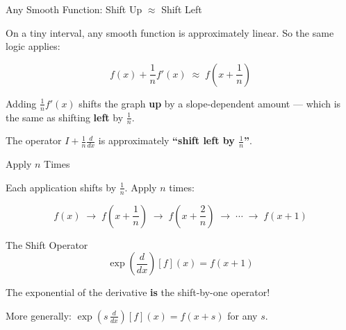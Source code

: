 \documentclass[10pt]{beamer}
\theoremstyle{definition}
\newcommand{\x}[1]{\alert{\textbf{#1}}}
\begin{document}
\begin{frame}[shrink=3]{Any Smooth Function: Shift Up $\approx$ Shift Left}

On a tiny interval, any smooth function is approximately linear. So the same logic applies:

$$f(x) + \frac{1}{n}f'(x) \;\approx\; f\!\left(x + \frac{1}{n}\right)$$

\vfill

\begin{center}
\end{center}

\vfill\pause

Adding $\frac{1}{n}f'(x)$ shifts the graph \x{up} by a slope-dependent amount --- which is the same as shifting \x{left} by $\frac{1}{n}$.

\vfill

The operator $I + \frac{1}{n}\frac{d}{dx}$ is approximately \x{``shift left by $\frac{1}{n}$''}.

\end{frame}


\begin{frame}{Apply $n$ Times}

Each application shifts by $\frac{1}{n}$. Apply $n$ times:

\vfill

$$f(x) \;\longrightarrow\; f\!\left(x+\frac{1}{n}\right) \;\longrightarrow\; f\!\left(x+\frac{2}{n}\right) \;\longrightarrow\; \cdots \;\longrightarrow\; f(x+1)$$

\vfill\pause

\begin{block}{The Shift Operator}
$$\boxed{\exp\!\left(\frac{d}{dx}\right)[f](x) = f(x+1)}$$
\end{block}

\vfill

The exponential of the derivative \x{is} the shift-by-one operator!

\vfill\pause

More generally: $\exp\!\left(s\,\frac{d}{dx}\right)[f](x) = f(x+s)$ for any $s$.

\end{frame}
\end{document}
